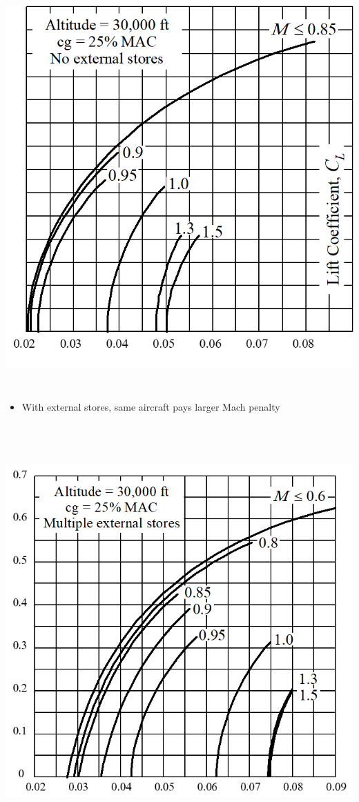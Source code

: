 \documentclass[
]{book}
\providecommand{\tightlist}{%
  \setlength{\itemsep}{0pt}\setlength{\parskip}{0pt}}
\begin{document}
\includegraphics[width=5.851in,height=6.075in]{media/05/image83.png}

\begin{itemize}
\tightlist
\item
  With external stores, same aircraft pays larger Mach penalty
\end{itemize}

\includegraphics[width=6.528in,height=6.229in]{media/05/image84.png}
\end{document}
